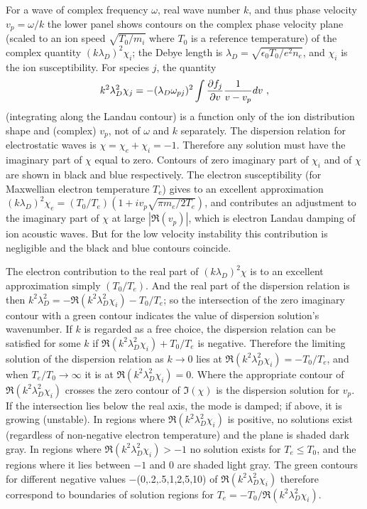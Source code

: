 \documentclass[12pt]{article}
\begin{document}
For a wave of complex frequency $\omega$, real wave number $k$, and
thus phase velocity $v_{p}=\omega/k$ the lower panel shows contours on
the complex phase velocity plane (scaled to an ion speed
$\sqrt{T_0/m_i}$ where $T_0$ is a reference temperature) of the
complex quantity $(k\lambda_D)^2\chi_i$; the Debye length is
$\lambda_D=\sqrt{\epsilon_0T_0/e^2n_e}$, and $\chi_i$ is the ion
susceptibility. For species $j$, the quantity
\begin{equation}\label{ionint}
  k^2\lambda_{D}^2 \chi_j = - (\lambda_D\omega_{pj})^2 \int  {\partial
    f_j\over \partial v } {1\over v- v_p} dv\ ,
\end{equation}
(integrating along the Landau contour) is a function only of the ion
distribution shape and (complex) $v_{p}$, not of $\omega$ and $k$
separately. The dispersion relation for electrostatic waves is
$\chi=\chi_e+\chi_i=-1$. Therefore any solution must have the
imaginary part of $\chi$ equal to zero. Contours of zero imaginary
part of $\chi_i$ and of $\chi$ are shown in black and blue
respectively. The electron susceptibility (for Maxwellian electron
temperature $T_e$) gives to an excellent approximation
$(k\lambda_D)^2\chi_e =(T_0/T_e)(1+iv_{p}\sqrt{\pi m_e/2T_e})$, and
contributes an adjustment to the imaginary part of $\chi$ at large
$|\Re(v_{p})|$, which is electron Landau damping of ion acoustic
waves. But for the low velocity instability this contribution is
negligible and the black and blue contours coincide.

The electron contribution to the real part of $(k\lambda_D)^2\chi$ is
to an excellent approximation simply $(T_0/T_e)$. And the real part of
the dispersion relation is then
$k^2\lambda_D^2 = -\Re(k^2\lambda_D^2\chi_i )-T_0/T_e$; so the
intersection of the zero imaginary contour with a green contour
indicates the value of dispersion solution's wavenumber. If $k$ is
regarded as a free choice, the dispersion relation can be satisfied
for some $k$ if $\Re(k^2\lambda_D^2\chi_i )+T_0/T_e$ is
negative. Therefore the limiting solution of the dispersion relation
as $k\to 0$ lies at $\Re(k^2\lambda_D^2\chi_i )=-T_0/T_e$, and when
$T_e/T_0\to \infty$ it is at $\Re(k^2\lambda_D^2\chi_i)=0$. Where the
appropriate contour of $\Re(k^2\lambda_D^2\chi_i)$ crosses the zero
contour of $\Im(\chi)$ is the dispersion solution for $v_{p}$. If the
intersection lies below the real axis, the mode is damped; if above,
it is growing (unstable). In regions where $\Re(k^2\lambda_D^2\chi_i)$
is positive, no solutions exist (regardless of non-negative electron
temperature) and the plane is shaded dark gray. In regions where
$\Re(k^2\lambda_D^2\chi_i)>-1$ no solution exists for $T_e\le T_0$,
and the regions where it lies between $-1$ and $0$ are shaded light
gray. The green contours for different negative values
$-$(0,.2,.5,1,2,5,10) of
$\Re(k^2\lambda_D^2\chi_i)$ therefore correspond to boundaries of
solution regions for $T_e=-T_0/\Re(k^2\lambda_D^2\chi_i)$.
\end{document}

